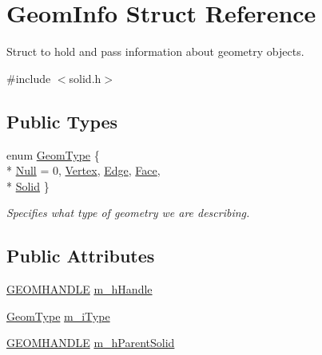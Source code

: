 \hypertarget{struct_geom_info}{\section{Geom\-Info Struct Reference}
\label{struct_geom_info}
}


Struct to hold and pass information about geometry objects.  




{\ttfamily \#include $<$solid.\-h$>$}

\subsection*{Public Types}
\begin{DoxyCompactItemize}
\item 
enum \hyperlink{struct_geom_info_a5599514c547c57d65f341d62b65caad0}{Geom\-Type} \{ \\*
\hyperlink{struct_geom_info_a5599514c547c57d65f341d62b65caad0ac4a683020056249df8d5ec2c435ed23e}{Null} = 0, 
\hyperlink{struct_geom_info_a5599514c547c57d65f341d62b65caad0a8b3ba3bda90e2e26cfd607d3bf2f10d7}{Vertex}, 
\hyperlink{struct_geom_info_a5599514c547c57d65f341d62b65caad0af10d43145fadd1fe008918de2d5eea55}{Edge}, 
\hyperlink{struct_geom_info_a5599514c547c57d65f341d62b65caad0ade4416774f0a723c80be9ce4f02b7b60}{Face}, 
\\*
\hyperlink{struct_geom_info_a5599514c547c57d65f341d62b65caad0abf8e24db95b4ab93e5a4fb3a93919435}{Solid}
 \}
\begin{DoxyCompactList}\small\item\em Specifies what type of geometry we are describing. \end{DoxyCompactList}\end{DoxyCompactItemize}
\subsection*{Public Attributes}
\begin{DoxyCompactItemize}
\item 
\hyperlink{vertex_8h_a72202e57358ed73cd212e9a2eaf39aeb}{G\-E\-O\-M\-H\-A\-N\-D\-L\-E} \hyperlink{struct_geom_info_a38fdd8d03050ce8b279b313eb53a7862}{m\-\_\-h\-Handle}
\item 
\hyperlink{struct_geom_info_a5599514c547c57d65f341d62b65caad0}{Geom\-Type} \hyperlink{struct_geom_info_a39b0270c2fa75ee91a7b43349440974d}{m\-\_\-i\-Type}
\item 
\hyperlink{vertex_8h_a72202e57358ed73cd212e9a2eaf39aeb}{G\-E\-O\-M\-H\-A\-N\-D\-L\-E} \hyperlink{struct_geom_info_aa929dea8b11f72ae4489e73ef8f60f7a}{m\-\_\-h\-Parent\-Solid}
\end{DoxyCompactItemize}


